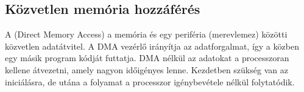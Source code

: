 \documentclass[../main.tex]{subfiles}
\begin{document}
\subsection{Közvetlen memória hozzáférés}

A  (Direct Memory Access) a memória és egy periféria (merevlemez)
közötti közvetlen adatátvitel. A DMA vezérlő irányítja az adatforgalmat,
így a  közben egy másik program kódját futtatja. DMA nélkül az
adatokat a processzoran kellene átvezetni, amely nagyon időigényes lenne.
Kezdetben szükség van az iniciálásra, de utána a folyamat a processzor
igénybevétele nélkül folytatódik.
\end{document}
